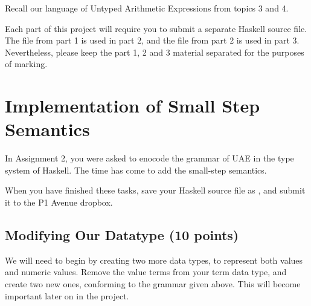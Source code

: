 \documentclass{exam}
\let\OldTexttt\texttt
\renewcommand{\texttt}[1]{\OldTexttt{\color{teal}{#1}}}
\begin{document}
\begin{center}
\end{center}

Recall our language of Untyped Arithmetic Expressions from topics 3 and 4. 
\begin{center}

\texttt{[image: figures/B\_smallstep.png]}

\texttt{[image: figures/A\_smallstep.png]}

\end{center}

Each part of this project will require you to submit a separate Haskell source file.  The file from part 1 is used in part 2, and the file from part 2 is used in part 3.  Nevertheless, please keep the part 1, 2 and 3 material separated for the purposes of marking.  

\section{Implementation of Small Step Semantics}

In Assignment 2, you were asked to enocode the grammar of UAE in the type system of Haskell.  The time has come to add the small-step semantics.

When you have finished these tasks, save your Haskell source file as \texttt{UAE1.hs}, and submit it to the P1 Avenue dropbox. 

\subsection{Modifying Our Datatype (10 points)}

We will need to begin by creating two more data types, to represent both values and numeric values.  Remove the value terms from your term data type, and create two new ones, conforming to the grammar given above.  This will become important later on in the project.  \\
\end{document}
